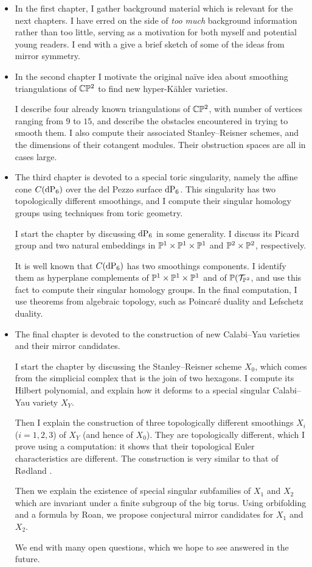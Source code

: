 \begin{itemize}
\item In the first chapter, I gather background material which is relevant for the next chapters. I have erred on the side of \emph{too much} background information rather than too little, serving as a motivation for both myself and potential young readers. I end with a give a brief sketch of some of the ideas from mirror symmetry.

\item In the second chapter I motivate the original naïve idea about smoothing triangulations of $\C \P^2$ to find new hyper-Kähler varieties.

I describe four already known triangulations of $\C \P^2$, with number of vertices ranging from $9$ to $15$,  and describe the obstacles encountered in trying to smooth them. I also compute their associated Stanley--Reisner schemes, and the dimensions of their cotangent modules. Their obstruction spaces are all in cases large.

\item The third chapter is devoted to a special toric singularity, namely the affine cone $C(\dP6)$ over the del Pezzo surface $\dP6$. This singularity has two topologically different smoothings, and I compute their singular homology groups using techniques from toric geometry.

I start the chapter by discussing $\dP6$ in some generality. I discuss its Picard group and two natural embeddings in $\P^1 \times \P^1 \times \P^1$ and $\P^2 \times \P^2$, respectively.

It is well known that $C(\dP6)$ has two smoothings components. I identify them as hyperplane complements of $\P^1 \times \P^1 \times \P^1$ and of $\P(\mathcal T_{\P^2}$, and use this fact to compute their singular homology groups. In the final computation, I use theorems from algebraic topology, such as Poincaré duality and Lefschetz duality. 

\item The final chapter is devoted to the construction of new Calabi--Yau varieties and their mirror candidates.

I start the chapter by discussing the Stanley--Reisner scheme $X_0$, which comes from the simplicial complex that is the join of two hexagons. I compute its Hilbert polynomial, and explain how it deforms to a special singular Calabi--Yau variety $X_Y$.

Then I explain the construction of three topologically different smoothings $X_i$ ($i=1,2,3$) of $X_Y$ (and hence of $X_0$). They are topologically different, which I prove using a \MM computation: it shows that their topological Euler characteristics are different. The construction is very similar to that of Rødland \cite{rodland_pfaffian}.

Then we explain the existence of special singular subfamilies of $X_1$ and $X_2$ which are invariant under a finite subgroup of the big torus. Using orbifolding and a formula by Roan, we propose conjectural mirror candidates for $X_1$ and $X_2$.

We end with many open questions, which we hope to see answered in the future.
\end{itemize}


